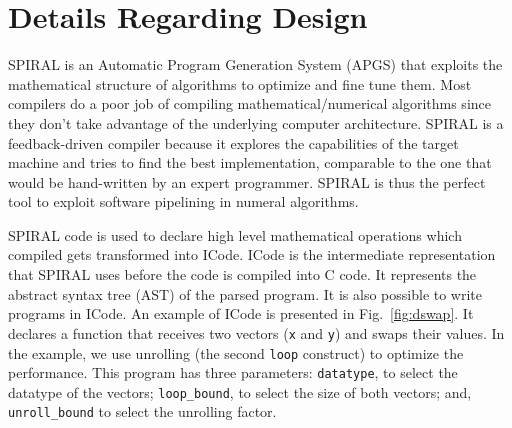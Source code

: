 \documentclass[12pt]{article}
\begin{document}
\begin{comment}
   Given a loop described at the ICode level we want to do three things:
   0. Apply a transformation to turn it into a 3 software pipelined loops
   (prologue, steady state, and epilogue). The prologue and the epilogue
   space out computation as best as possible while preserving ordering. And
   the steady state mirrors the original loop in terms of the order of
   instructions, but the elements that each instruction is operating on are
   from different loop iterations.

   1. We want unroll all 3 of the loops. We do this because we don't want
   to deal with register allocation (this would involve implementing
   iterative-modulo scheduling), we would rather let the compiler figure
   out the allocations instead. As a bonus, we drop the loop overhead.

   2. Then we want to instrument those instructions with labels from goto
   statements, so we can force the schedule. By placing a label between
   each instruction and making the control flow unpredictable at compile
   time, the compiler is forced to preserve this schedule.
\end{comment}


\section{Details Regarding Design}

SPIRAL is an Automatic Program Generation System (APGS) that exploits the mathematical
structure of algorithms to optimize and fine tune them. Most compilers do
a poor job of compiling mathematical/numerical algorithms since they don't take advantage
of the underlying computer architecture. SPIRAL is a feedback-driven compiler because
it explores the capabilities of the target machine and tries to find the best
implementation, comparable to the one that would be hand-written by an expert programmer.
SPIRAL is thus the perfect tool to exploit software pipelining in numeral algorithms.

SPIRAL code is used to declare high level mathematical operations which compiled gets transformed
into ICode. ICode is the intermediate representation that SPIRAL uses before the code is compiled into C code.
It represents the abstract syntax tree (AST) of the parsed program.
It is also possible to write programs in ICode. An example of ICode is presented in Fig.~\ref{fig:dswap}.
It declares a function that receives two vectors (\texttt{x} and \texttt{y}) and swaps their values.
In the example, we use unrolling (the second \texttt{loop} construct) to optimize the performance.
This program has three parameters: \texttt{datatype}, to select the datatype of the vectors;
\texttt{loop\_bound}, to select the size of both vectors; and, \texttt{unroll\_bound} to select the unrolling factor.
\end{document}

